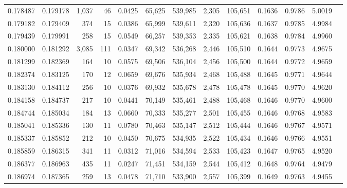 \begin{tabular}{rrrrrrrrrrrrr}
0.178487 & 0.179178 & 1,037 &  46 &                                     0.0425 &  65,625 & 539,985 &   2,305 & 105,651 & 0.1636 & 0.9786 & 5.0019 \\
0.179182 & 0.179409 &   374 &  15 &                                     0.0386 &  65,999 & 539,611 &   2,320 & 105,636 & 0.1637 & 0.9785 & 4.9984 \\
0.179439 & 0.179991 &   258 &  15 &                                     0.0549 &  66,257 & 539,353 &   2,335 & 105,621 & 0.1638 & 0.9784 & 4.9960 \\
0.180000 & 0.181292 & 3,085 & 111 &                                     0.0347 &  69,342 & 536,268 &   2,446 & 105,510 & 0.1644 & 0.9773 & 4.9675 \\
0.181299 & 0.182369 &   164 &  10 &                                     0.0575 &  69,506 & 536,104 &   2,456 & 105,500 & 0.1644 & 0.9772 & 4.9659 \\
0.182374 & 0.183125 &   170 &  12 &                                     0.0659 &  69,676 & 535,934 &   2,468 & 105,488 & 0.1645 & 0.9771 & 4.9644 \\
0.183130 & 0.184112 &   256 &  10 &                                     0.0376 &  69,932 & 535,678 &   2,478 & 105,478 & 0.1645 & 0.9770 & 4.9620 \\
0.184158 & 0.184737 &   217 &  10 &                                     0.0441 &  70,149 & 535,461 &   2,488 & 105,468 & 0.1646 & 0.9770 & 4.9600 \\
0.184744 & 0.185034 &   184 &  13 &                                     0.0660 &  70,333 & 535,277 &   2,501 & 105,455 & 0.1646 & 0.9768 & 4.9583 \\
0.185041 & 0.185336 &   130 &  11 &                                     0.0780 &  70,463 & 535,147 &   2,512 & 105,444 & 0.1646 & 0.9767 & 4.9571 \\
0.185337 & 0.185852 &   212 &  10 &                                     0.0450 &  70,675 & 534,935 &   2,522 & 105,434 & 0.1646 & 0.9766 & 4.9551 \\
0.185859 & 0.186315 &   341 &  11 &                                     0.0312 &  71,016 & 534,594 &   2,533 & 105,423 & 0.1647 & 0.9765 & 4.9520 \\
0.186377 & 0.186963 &   435 &  11 &                                     0.0247 &  71,451 & 534,159 &   2,544 & 105,412 & 0.1648 & 0.9764 & 4.9479 \\
0.186974 & 0.187365 &   259 &  13 &                                     0.0478 &  71,710 & 533,900 &   2,557 & 105,399 & 0.1649 & 0.9763 & 4.9455 \\

\end{tabular}
